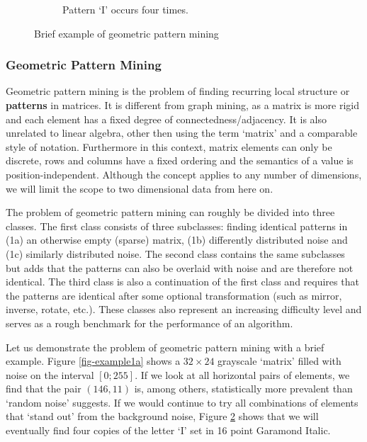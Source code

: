 \documentclass{llncs}
\begin{document}
\begin{figure}[b]
\begin{subfigure}[t]{0.37\textwidth}
\caption{Pattern `I' occurs four times.}
\label{fig-example1c}
\end{subfigure}%
\caption{Brief example of geometric pattern mining}
\end{figure}  

\subsubsection{Geometric Pattern Mining}

Geometric pattern mining is the problem of finding recurring local structure or \textbf{patterns} in matrices. It is different from graph mining, as a matrix is more rigid and each element has a fixed degree of connectedness/adjacency. It is also unrelated to linear algebra, other then using the term `matrix' and a comparable style of notation. Furthermore in this context, matrix elements can only be discrete, rows and columns have a fixed ordering and the semantics of a value is position-independent. Although the concept applies to any number of dimensions, we will limit the scope to two dimensional data from here on.

The problem of geometric pattern mining can roughly be divided into three classes. The first class consists of three subclasses: finding identical patterns in (1a) an otherwise empty (sparse) matrix, (1b) differently distributed noise and (1c) similarly distributed noise. The second class contains the same subclasses but adds that the patterns can also be overlaid with noise and are therefore not identical. The third class is also a continuation of the first class and requires that the patterns are identical after some optional transformation (such as mirror, inverse, rotate, etc.). These classes also represent an increasing difficulty level and serves as a rough benchmark for the performance of an algorithm. 

Let us demonstrate the problem of geometric pattern mining with a brief example. Figure \ref{fig-example1a} shows a $32 \times 24$ grayscale `matrix' filled with noise on the interval $[0;255]$. If we look at all horizontal pairs of elements, we find that the pair $(146,11)$ is, among others, statistically more prevalent than `random noise' suggests. If we would continue to try all combinations of elements that `stand out' from the background noise, Figure \ref{fig-example1c} shows that we will eventually find four copies of the letter `I' set in 16 point Garamond Italic.
\end{document}
